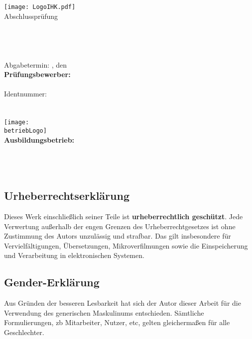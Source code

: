\begin{titlepage}

\begin{center}
\texttt{[image: LogoIHK.pdf]}\\[1ex]
\Large{Abschlussprüfung \pruefungstermin}\\[3ex]

\Large{\ausbildungsberuf}\\[1ex]
\LARGE{\betreff}\\[4ex]

\huge{\textbf{\titel}}\\[1.5ex]
\Large{\textbf{\untertitel}}\\[4ex]

\normalsize
Abgabetermin: \abgabeOrt, den \abgabeTermin\\[3em]
\textbf{Prüfungsbewerber:}\\
\autorName\\
Identnummer: \autorId\\
\autorAnschrift\\
\autorOrt\\[5ex]

\texttt{[image: \\betriebLogo]}\\[2ex]
\textbf{Ausbildungsbetrieb:}\\
\betriebName\\
\betriebAnschrift\\
\betriebOrt\\[5em]
\end{center}

\small
\noindent
\subsection*{Urheberrechtserklärung}
Dieses Werk einschließlich seiner Teile ist \textbf{urheberrechtlich geschützt}.
Jede Verwertung außerhalb der engen Grenzen des Urheberrechtgesetzes ist ohne
Zustimmung des Autors unzulässig und strafbar. Das gilt insbesondere für
Vervielfältigungen, Übersetzungen, Mikroverfilmungen sowie die Einspeicherung
und Verarbeitung in elektronischen Systemen.

\subsection*{Gender-Erklärung}
Aus Gründen der besseren Lesbarkeit hat sich der Autor dieser Arbeit für
die Verwendung des generischen Maskulinums entschieden.
Sämtliche Formulierungen, \acs{zb} Mitarbeiter, Nutzer, \acs{etc}, gelten
gleichermaßen für alle Geschlechter.
\end{titlepage}